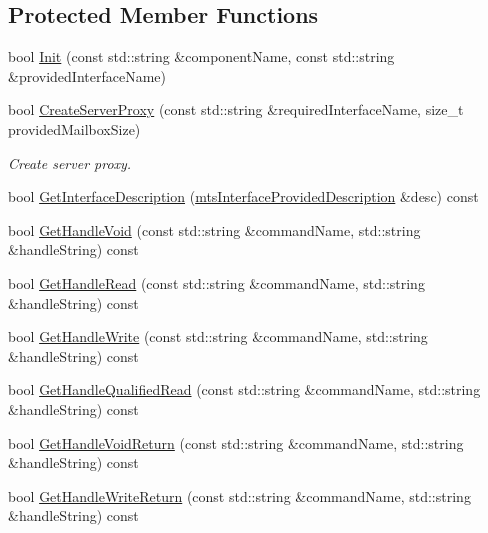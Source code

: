 \subsection*{Protected Member Functions}
\begin{DoxyCompactItemize}
\item 
bool \hyperlink{classmts_socket_proxy_server_a484df52523d8ba237358a6cc56b8d67a}{Init} (const std\-::string \&component\-Name, const std\-::string \&provided\-Interface\-Name)
\item 
bool \hyperlink{classmts_socket_proxy_server_a8040ee220cf3249685932aad1cf52231}{Create\-Server\-Proxy} (const std\-::string \&required\-Interface\-Name, size\-\_\-t provided\-Mailbox\-Size)
\begin{DoxyCompactList}\small\item\em Create server proxy. \end{DoxyCompactList}\item 
bool \hyperlink{classmts_socket_proxy_server_aac2d100483f25d78682b8137546a8c25}{Get\-Interface\-Description} (\hyperlink{classmts_interface_provided_description}{mts\-Interface\-Provided\-Description} \&desc) const 
\item 
bool \hyperlink{classmts_socket_proxy_server_ab9a97e4761a5824bdb8cdd2b2f29b530}{Get\-Handle\-Void} (const std\-::string \&command\-Name, std\-::string \&handle\-String) const 
\item 
bool \hyperlink{classmts_socket_proxy_server_a33f70a2d493e886ecd92321928aeef9a}{Get\-Handle\-Read} (const std\-::string \&command\-Name, std\-::string \&handle\-String) const 
\item 
bool \hyperlink{classmts_socket_proxy_server_a44b7dcdd1649d6f8766fbc5eca76f07c}{Get\-Handle\-Write} (const std\-::string \&command\-Name, std\-::string \&handle\-String) const 
\item 
bool \hyperlink{classmts_socket_proxy_server_a9fc0e7143f33f086e8ed0e77946e294c}{Get\-Handle\-Qualified\-Read} (const std\-::string \&command\-Name, std\-::string \&handle\-String) const 
\item 
bool \hyperlink{classmts_socket_proxy_server_a432865d53e1346134ddcc41422b013f2}{Get\-Handle\-Void\-Return} (const std\-::string \&command\-Name, std\-::string \&handle\-String) const 
\item 
bool \hyperlink{classmts_socket_proxy_server_aa23bcc2804b23e7db80431e83caa3b3f}{Get\-Handle\-Write\-Return} (const std\-::string \&command\-Name, std\-::string \&handle\-String) const 
\item 

\end{DoxyCompactItemize}
